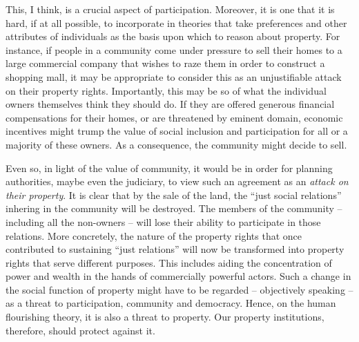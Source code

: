 This, I think, is a crucial aspect of participation. Moreover, it is one that it is hard, if at all possible, to incorporate in theories that take  preferences and other attributes of individuals as the basis upon which to reason about property. For instance, if people in a community come under pressure to sell their homes to a large commercial company that wishes to raze them in order to construct a shopping mall, it may be appropriate to consider this as an unjustifiable attack on their property rights. Importantly, this may be so  of what the individual owners themselves think they should do. If they are offered generous financial compensations for their homes, or are threatened by eminent domain, economic incentives might trump the value of social inclusion and participation for all or a majority of these owners. As a consequence, the community might decide to sell.  

Even so, in light of the value of community, it would be in order for planning authorities, maybe even the judiciary, to view such an  agreement as an {\it attack on their property}. It is clear that by the sale of the land, the ``just social relations'' inhering in the community will be destroyed. The members of the community -- including all the non-owners -- will lose their ability to participate in those relations. More concretely, the nature of the property rights that once contributed to sustaining ``just relations'' will now be transformed into property rights that serve different purposes. This includes aiding the concentration of power and wealth in the hands of commercially powerful actors. Such a change in the social function of property might have to be regarded -- objectively speaking -- as a threat to participation, community and democracy. Hence, on the human flourishing theory, it is also a threat to property. Our property institutions, therefore, should protect against it.

